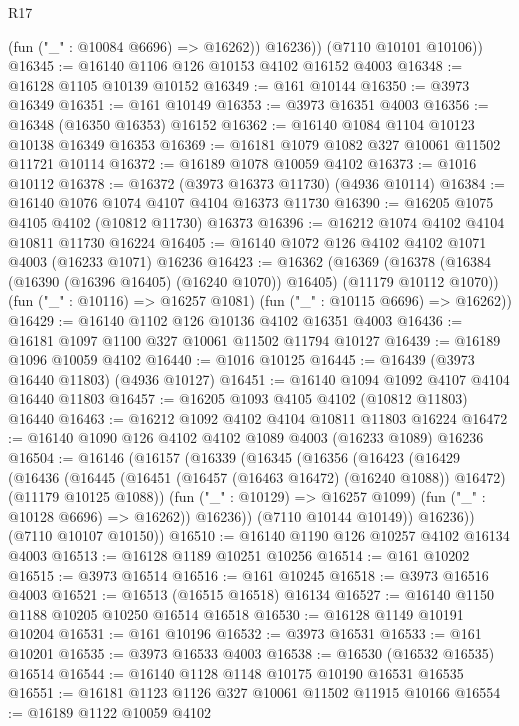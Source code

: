 \begin{lexlean}{R17}
\begin{coremodule}
            (fun ("_" : @10084 @6696) => @16262))
          @16236))
      (@7110 @10101 @10106))
@16345 := @16140 @1106 @126 @10153 @4102 @16152 @4003
@16348 := @16128 @1105 @10139 @10152
@16349 := @161 @10144
@16350 := @3973 @16349
@16351 := @161 @10149
@16353 := @3973 @16351 @4003
@16356 := @16348 (@16350 @16353) @16152
@16362 := @16140 @1084 @1104 @10123 @10138 @16349 @16353
@16369 := @16181 @1079 @1082 @327 @10061 @11502 @11721 @10114
@16372 := @16189 @1078 @10059 @4102
@16373 := @1016 @10112
@16378 := @16372 (@3973 @16373 @11730) (@4936 @10114)
@16384 := @16140 @1076 @1074 @4107 @4104 @16373 @11730
@16390 := @16205 @1075 @4105 @4102 (@10812 @11730) @16373
@16396 := @16212 @1074 @4102 @4104 @10811 @11730 @16224
@16405 := @16140 @1072 @126 @4102 @4102 @1071 @4003 (@16233 @1071) @16236
@16423 := @16362
    (@16369
      (@16378 (@16384 (@16390 (@16396 @16405) (@16240 @1070)) @16405) (@11179 @10112 @1070))
      (fun ("_" : @10116) => @16257 @1081)
      (fun ("_" : @10115 @6696) => @16262))
@16429 := @16140 @1102 @126 @10136 @4102 @16351 @4003
@16436 := @16181 @1097 @1100 @327 @10061 @11502 @11794 @10127
@16439 := @16189 @1096 @10059 @4102
@16440 := @1016 @10125
@16445 := @16439 (@3973 @16440 @11803) (@4936 @10127)
@16451 := @16140 @1094 @1092 @4107 @4104 @16440 @11803
@16457 := @16205 @1093 @4105 @4102 (@10812 @11803) @16440
@16463 := @16212 @1092 @4102 @4104 @10811 @11803 @16224
@16472 := @16140 @1090 @126 @4102 @4102 @1089 @4003 (@16233 @1089) @16236
@16504 := @16146
    (@16157
      (@16339
        (@16345
          (@16356
            (@16423
              (@16429
                (@16436
                  (@16445
                    (@16451 (@16457 (@16463 @16472) (@16240 @1088)) @16472)
                    (@11179 @10125 @1088))
                  (fun ("_" : @10129) => @16257 @1099)
                  (fun ("_" : @10128 @6696) => @16262))
                @16236))
            (@7110 @10144 @10149))
          @16236))
      (@7110 @10107 @10150))
@16510 := @16140 @1190 @126 @10257 @4102 @16134 @4003
@16513 := @16128 @1189 @10251 @10256
@16514 := @161 @10202
@16515 := @3973 @16514
@16516 := @161 @10245
@16518 := @3973 @16516 @4003
@16521 := @16513 (@16515 @16518) @16134
@16527 := @16140 @1150 @1188 @10205 @10250 @16514 @16518
@16530 := @16128 @1149 @10191 @10204
@16531 := @161 @10196
@16532 := @3973 @16531
@16533 := @161 @10201
@16535 := @3973 @16533 @4003
@16538 := @16530 (@16532 @16535) @16514
@16544 := @16140 @1128 @1148 @10175 @10190 @16531 @16535
@16551 := @16181 @1123 @1126 @327 @10061 @11502 @11915 @10166
@16554 := @16189 @1122 @10059 @4102

\end{coremodule}
\end{lexlean}
